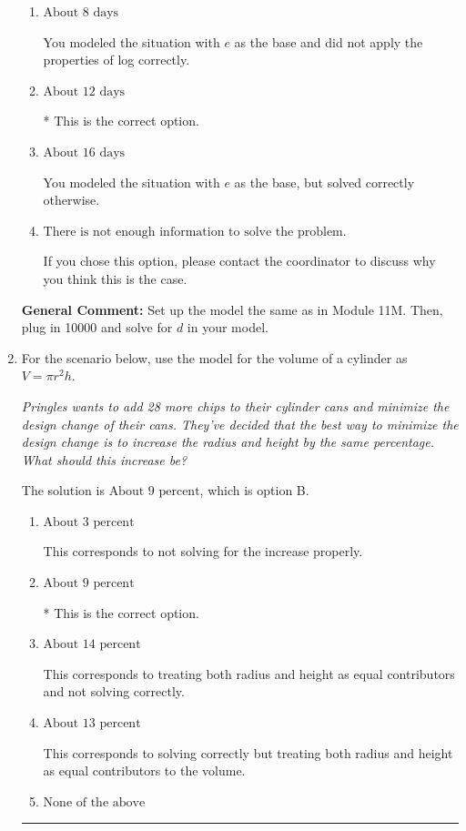 \documentclass{extbook}[14pt]
\newcommand{\litem}[1]{\item #1

\rule{\textwidth}{0.4pt}}
\begin{document}
\begin{enumerate}
{\begin{enumerate}[label=\Alph*.]
You modeled the situation correctly but did not apply the properties of log correctly.
\item \( \text{About } 8 \text{ days} \)

You modeled the situation with $e$ as the base and did not apply the properties of log correctly.
\item \( \text{About } 12 \text{ days} \)

* This is the correct option.
\item \( \text{About } 16 \text{ days} \)

You modeled the situation with $e$ as the base, but solved correctly otherwise.
\item \( \text{There is not enough information to solve the problem.} \)

If you chose this option, please contact the coordinator to discuss why you think this is the case.
\end{enumerate}

\textbf{General Comment:} Set up the model the same as in Module 11M. Then, plug in 10000 and solve for $d$ in your model.
}
\litem{
For the scenario below, use the model for the volume of a cylinder as $V = \pi r^2 h$.

\begin{center}
    \textit{ Pringles wants to add 28 \text{percent} more chips to their cylinder cans and minimize the design change of their cans. They've decided that the best way to minimize the design change is to increase the radius and height by the same percentage. What should this increase be? }
\end{center}


The solution is \( \text{About } 9 \text{ percent} \), which is option B.\begin{enumerate}[label=\Alph*.]
\item \( \text{About } 3 \text{ percent} \)

This corresponds to not solving for the increase properly.
\item \( \text{About } 9 \text{ percent} \)

* This is the correct option.
\item \( \text{About } 14 \text{ percent} \)

This corresponds to treating both radius and height as equal contributors and not solving correctly.
\item \( \text{About } 13 \text{ percent} \)

This corresponds to solving correctly but treating both radius and height as equal contributors to the volume.
\item \( \text{None of the above} \)


\end{enumerate}}
\end{enumerate}
\end{document}
